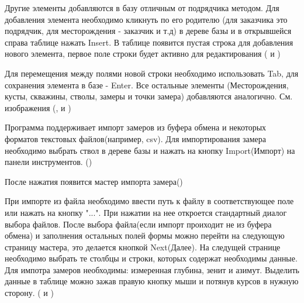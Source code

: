 
Другие элементы добавляются в базу отличным от подрядчика методом. Для добавления элемента необходимо кликнуть по его родителю
(для заказчика это подрядчик, для месторождения - заказчик и т.д) в дереве базы и в открывшейся справа таблице нажать Insert.
В таблице появится пустая строка для добавления нового элемента, первое поле строки будет активно для редактирования
( и )


Для перемещения между полями новой строки необходимо использовать Tab, для сохранения элемента в базе - Enter. Все остальные элементы
(Месторождения, кусты, скважины, стволы, замеры и точки замера) добавляются аналогично. См. изображения
(,  и )

Программа поддерживает импорт замеров из буфера обмена и некоторых форматов текстовых файлов(например, csv).
Для импортирования замера необходимо выбрать ствол в дереве базы и нажать на кнопку Import(Импорт) на панели инструментов.
()


После нажатия появится мастер импорта замера()


При импорте из файла необходимо ввести путь к файлу в соответствующее поле или нажать на кнопку "...".
При нажатии на нее откроется стандартный диалог выбора файлов. После выбора файла(если импорт проиходит не из буфера обмена) и
заполнения остальных полей формы можно перейти на следующую страницу мастера, это делается кнопкой Next(Далее).
На следущей странице необходимо выбрать те столбцы и строки, которых содержат необходимы данные. Для импотра замеров необходимы: измеренная глубина, зенит и азимут.
Выделить данные в таблице можно зажав правую кнопку мыши и потянув курсов в нужную сторону.
( и )


